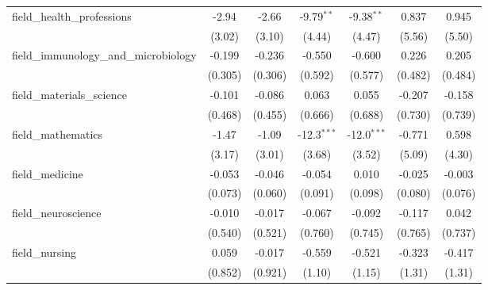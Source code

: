 \begin{tabular}{lcccccc}
   field\_health\_professions                                  & -2.94         & -2.66         & -9.79$^{**}$  & -9.38$^{**}$  & 0.837        & 0.945\\   
                                                               & (3.02)        & (3.10)        & (4.44)        & (4.47)        & (5.56)       & (5.50)\\   
   field\_immunology\_and\_microbiology                        & -0.199        & -0.236        & -0.550        & -0.600        & 0.226        & 0.205\\   
                                                               & (0.305)       & (0.306)       & (0.592)       & (0.577)       & (0.482)      & (0.484)\\   
   field\_materials\_science                                   & -0.101        & -0.086        & 0.063         & 0.055         & -0.207       & -0.158\\   
                                                               & (0.468)       & (0.455)       & (0.666)       & (0.688)       & (0.730)      & (0.739)\\   
   field\_mathematics                                          & -1.47         & -1.09         & -12.3$^{***}$ & -12.0$^{***}$ & -0.771       & 0.598\\   
                                                               & (3.17)        & (3.01)        & (3.68)        & (3.52)        & (5.09)       & (4.30)\\   
   field\_medicine                                             & -0.053        & -0.046        & -0.054        & 0.010         & -0.025       & -0.003\\   
                                                               & (0.073)       & (0.060)       & (0.091)       & (0.098)       & (0.080)      & (0.076)\\   
   field\_neuroscience                                         & -0.010        & -0.017        & -0.067        & -0.092        & -0.117       & 0.042\\   
                                                               & (0.540)       & (0.521)       & (0.760)       & (0.745)       & (0.765)      & (0.737)\\   
   field\_nursing                                              & 0.059         & -0.017        & -0.559        & -0.521        & -0.323       & -0.417\\   
                                                               & (0.852)       & (0.921)       & (1.10)        & (1.15)        & (1.31)       & (1.31)\\   

\end{tabular}
